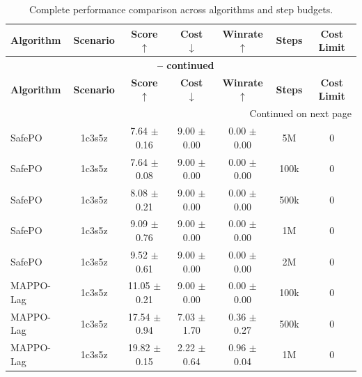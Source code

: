 \begin{longtable}{lcccccc}
\caption{Complete performance comparison across algorithms and step budgets.}
\label{tab:complete_performance_comparison_100k} \\
\toprule
\textbf{Algorithm} & \textbf{Scenario} & \textbf{Score} $\uparrow$ & \textbf{Cost} $\downarrow$ & \textbf{Winrate} $\uparrow$ & \textbf{Steps} & \textbf{Cost Limit} \\
\midrule
\endfirsthead
\multicolumn{7}{c}{{\bfseries \tablename\ \thetable{} -- continued}} \\
\toprule
\textbf{Algorithm} & \textbf{Scenario} & \textbf{Score} $\uparrow$ & \textbf{Cost} $\downarrow$ & \textbf{Winrate} $\uparrow$ & \textbf{Steps} & \textbf{Cost Limit} \\
\midrule
\endhead
\midrule \multicolumn{7}{r}{{Continued on next page}} \\
\endfoot
\bottomrule
\endlastfoot
SafePO & 1c3s5z & \textcolor{green!60!black}{7.64 $\pm$ 0.16} & \textcolor{green!60!black}{9.00 $\pm$ 0.00} & \textcolor{green!60!black}{0.00 $\pm$ 0.00} & 5M & 0 \\
SafePO & 1c3s5z & \textcolor{green!60!black}{7.64 $\pm$ 0.08} & \textcolor{green!60!black}{9.00 $\pm$ 0.00} & \textcolor{green!60!black}{0.00 $\pm$ 0.00} & 100k & 0 \\
SafePO & 1c3s5z & \textcolor{green!60!black}{8.08 $\pm$ 0.21} & \textcolor{green!60!black}{9.00 $\pm$ 0.00} & \textcolor{green!60!black}{0.00 $\pm$ 0.00} & 500k & 0 \\
SafePO & 1c3s5z & \textcolor{green!60!black}{9.09 $\pm$ 0.76} & \textcolor{green!60!black}{9.00 $\pm$ 0.00} & \textcolor{green!60!black}{0.00 $\pm$ 0.00} & 1M & 0 \\
SafePO & 1c3s5z & \textcolor{green!60!black}{9.52 $\pm$ 0.61} & \textcolor{green!60!black}{9.00 $\pm$ 0.00} & \textcolor{green!60!black}{0.00 $\pm$ 0.00} & 2M & 0 \\
MAPPO-Lag & 1c3s5z & \textcolor{green!60!black}{11.05 $\pm$ 0.21} & \textcolor{green!60!black}{9.00 $\pm$ 0.00} & \textcolor{green!60!black}{0.00 $\pm$ 0.00} & 100k & 0 \\
MAPPO-Lag & 1c3s5z & \textcolor{green!60!black}{17.54 $\pm$ 0.94} & \textcolor{green!60!black}{7.03 $\pm$ 1.70} & \textcolor{green!60!black}{0.36 $\pm$ 0.27} & 500k & 0 \\
MAPPO-Lag & 1c3s5z & \textcolor{red!70!black}{19.82 $\pm$ 0.15} & \textcolor{red!70!black}{2.22 $\pm$ 0.64} & \textcolor{red!70!black}{0.96 $\pm$ 0.04} & 1M & 0 \\

\end{longtable}
